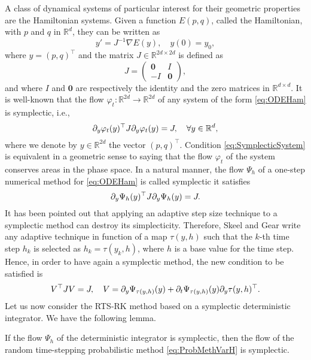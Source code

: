 \documentclass{siamart1116}
\numberwithin{theorem}{section}
\renewcommand{\phi}{\varphi}
\newcommand{\pdv}[2]{\ensuremath\partial_{#2}#1}
\newcommand{\R}{\mathbb{R}}
\begin{document}
{A class of dynamical systems of particular interest for their geometric properties are the Hamiltonian systems. Given a function $E(p, q)$, called the Hamiltonian, with $p$ and $q$ in $\R^d$, they can be written as
\begin{equation}\label{eq:ODEHam}
	y' = J^{-1}\nabla E(y), \quad y(0) = y_0,
\end{equation}
where $y = (p, q)^\top$ and the matrix $J\in\R^{2d \times 2d}$ is defined as
\begin{equation}
	J = \begin{pmatrix} \mathbf{0} & I \\ -I & \mathbf{0} \end{pmatrix},
\end{equation}
and where $I$ and $\mathbf{0}$ are respectively the identity and the zero matrices in $\R^{d\times d}$. It is well-known that the flow $\phi_t\colon\R^{2d}\to\R^{2d}$ of any system of the form \eqref{eq:ODEHam} is symplectic, i.e., 
\begin{equation}\label{eq:SymplecticSystem}
	\pdv{\phi_t(y)}{y}^\top J \pdv{\phi_t(y)}{y} = J, \quad \forall y \in \R^d,
\end{equation}
where we denote by $y\in \R^{2d}$ the vector $(p, q)^\top$. Condition \eqref{eq:SymplecticSystem} is equivalent in a geometric sense to saying that the flow $\phi_t$ of the system conserves areas in the phase space. In a natural manner, the flow $\Psi_h$ of a one-step numerical method for \eqref{eq:ODEHam} is called symplectic it satisfies
\begin{equation}\label{eq:SymplecticMethod}
	\pdv{\Psi_h(y)}{y}^\top J \pdv{\Psi_h(y)}{y} = J.
\end{equation}
It has been pointed out \cite{SkG92, HLW06} that applying an adaptive step size technique to a symplectic method can destroy its simplecticity. Therefore, Skeel and Gear \cite{SkG92} write any adaptive technique in function of a map $\tau(y, h)$ such that the $k$-th time step $h_k$ is selected as $h_k = \tau(y_k, h)$, where $h$ is a base value for the time step. Hence, in order to have again a symplectic method, the new condition to be satisfied is
\begin{equation}\label{eq:SymplecticCondition}
	V^\top J V = J, \quad V = \pdv{\Psi_{\tau(y, h)}(y)}{y} + \pdv{\Psi_{\tau(y, h)}(y)}{t}\pdv{\tau(y, h)}{y}^\top.
\end{equation}
Let us now consider the RTS-RK method based on a symplectic deterministic integrator. We have the following lemma. 
\begin{lemma}\label{lem:SympRTSRK} If the flow $\Psi_h$ of the deterministic integrator is symplectic, then the flow of the random time-stepping probabilistic method \eqref{eq:ProbMethVarH} is symplectic.

\end{lemma}}
\end{document}
